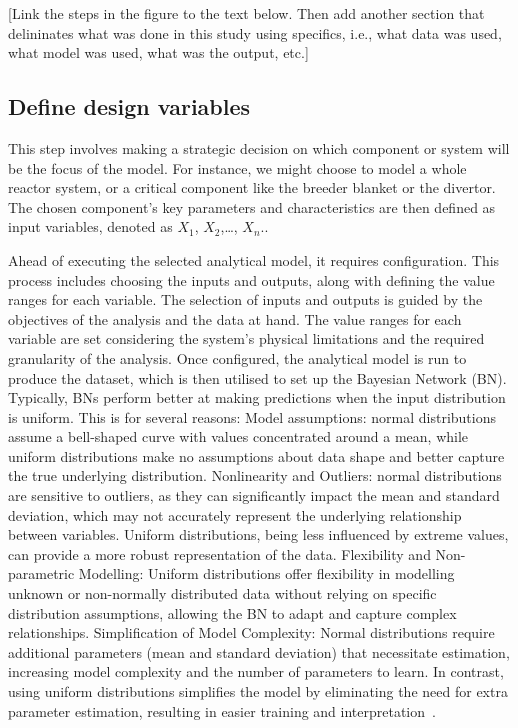 \documentclass[journal]{IEEEtran}
\begin{document}
[Link the steps in the figure to the text below. Then add another section that delininates what was done in this study using specifics, i.e., what data was used, what model was used, what was the output, etc.]

\subsection{Define design variables}\label{sec:design}
This step involves making a strategic decision on which component or system will be the focus of the model. For instance, we might choose to model a whole reactor system, or a critical component like the breeder blanket or the divertor. The chosen component's key parameters and characteristics are then defined as input variables, denoted as $X_1$, $X_2$,\ldots, $X_n$..

Ahead of executing the selected analytical model, it requires configuration. This process includes choosing the inputs and outputs, along with defining the value ranges for each variable. The selection of inputs and outputs is guided by the objectives of the analysis and the data at hand. The value ranges for each variable are set considering the system's physical limitations and the required granularity of the analysis. Once configured, the analytical model is run to produce the dataset, which is then utilised to set up the Bayesian Network (BN). Typically, BNs perform better at making predictions when the input distribution is uniform. This is for several reasons: Model assumptions: normal distributions assume a bell-shaped curve with values concentrated around a mean, while uniform distributions make no assumptions about data shape and better capture the true underlying distribution. Nonlinearity and Outliers: normal distributions are sensitive to outliers, as they can significantly impact the mean and standard deviation, which may not accurately represent the underlying relationship between variables. Uniform distributions, being less influenced by extreme values, can provide a more robust representation of the data. Flexibility and Non-parametric Modelling: Uniform distributions offer flexibility in modelling unknown or non-normally distributed data without relying on specific distribution assumptions, allowing the BN to adapt and capture complex relationships. Simplification of Model Complexity: Normal distributions require additional parameters (mean and standard deviation) that necessitate estimation, increasing model complexity and the number of parameters to learn. In contrast, using uniform distributions simplifies the model by eliminating the need for extra parameter estimation, resulting in easier training and interpretation~\cite{Duda1973PatternAnalysis, Neapolitan2004LearningNetworks, Koller2009ProbabilisticTechniques}.
\end{document}
